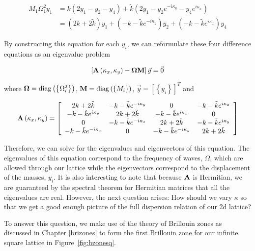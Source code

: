 \begin{align}
  M_1\Omega_1^{2}y_1
      &=k\left(2y_1-y_2-y_4\right)+
       \tilde{k}\left(2y_1-y_{2}e^{-i\kappa_y}-y_{4}e^{i\kappa_x}\right) \\
      &=\left(2k+2\tilde{k}\right)y_1+\left(-k-\tilde{k}e^{-i\kappa_y}\right)y_2+
       \left(-k-\tilde{k}e^{i\kappa_x}\right)y_4
\end{align}

By constructing this equation for each $y_i$, we can reformulate these four
difference equations as an eigenvalue problem

\begin{align}
  \left[\mathbf{A}\left(\kappa_{x},\kappa_{y}\right)-\mathbf{\Omega}\mathbf{M}\right]\vec{y}=\vec{0}
\label{eq:sqeig}
\end{align}

where $\mathbf{\Omega}=\operatorname{diag}\left(\left\{\Omega_i^2\right\}\right)$,
$\mathbf{M}=\operatorname{diag}\left(\left\{M_i\right\}\right)$,
$\vec{y}=\left[\left\{y_i\right\}\right]^T$ and

\begin{align}
  \mathbf{A}\left(\kappa_{x},\kappa_{y}\right)=\left[
\begin{array}{cccc}
2k+2\tilde{k} & -k-\tilde{k}e^{-i\kappa_{y}} & 0 & -k-\tilde{k}e^{i\kappa_{x}}\\
-k-\tilde{k}e^{i\kappa_{y}} & 2k+2\tilde{k} & -k-\tilde{k}e^{i\kappa_{x}} & 0\\
0 & -k-\tilde{k}e^{-i\kappa_{x}} & 2k+2\tilde{k} & -k-\tilde{k}e^{i\kappa_{y}}\\
-k-\tilde{k}e^{-i\kappa_{x}} & 0 & -k-\tilde{k}e^{-i\kappa_{y}} & 2k+2\tilde{k}
\end{array}\right]
\end{align}

Therefore, we can solve for the eigenvalues and eigenvectors of this equation.
The eigenvalues of this equation correspond to the frequency of waves,
$\Omega$, which are allowed through our lattice while the eigenvectors
correspond to the displacement of the masses, $y_i$. It is also interesting to
note that because $\mathbf{A}$ is Hermitian, we are guaranteed by the spectral
theorem for Hermitian matrices that all the eigenvalues are real. However, the
next question arises: How should we vary $\kappa$ so that we get a good enough
picture of the full dispersion relation of our 2d lattice?

To answer this question, we make use of the theory of Brillouin zones as
discussed in Chapter \ref{brizones} to form the first Brillouin zone for our
infinite square lattice in Figure~\ref{fig:bzonesq}.

